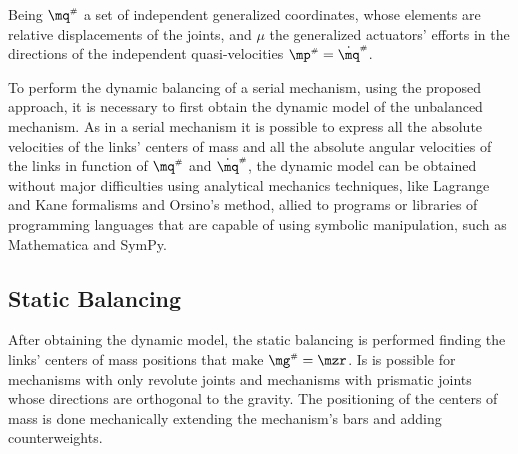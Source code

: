 \documentclass[a4paper,11pt,brazil,fleqn]{article}
\begin{document}
Being $\mq\ssh$ a set of independent generalized coordinates, whose elements are relative displacements of the joints, and $\mu$ the generalized actuators' efforts in the directions of the independent quasi-velocities $\mp\ssh = \dot{\mq}\ssh$.

To perform the dynamic balancing of a serial mechanism, using the proposed approach, it is necessary to first obtain the dynamic model of the unbalanced mechanism. As in a serial mechanism it is possible to express all the absolute velocities of the links' centers of mass and all the absolute angular velocities of the links in function of $\mq\ssh$ and $\dot{\mq}\ssh$, the dynamic model can be obtained without major difficulties using analytical mechanics techniques, like Lagrange and Kane formalisms and Orsino's method, allied to programs or libraries of programming languages that are capable of using symbolic manipulation, such as Mathematica and SymPy.


\subsection{Static Balancing}\label{S02-2}

After obtaining the dynamic model, the static balancing is performed finding the links' centers of mass positions that make $\mg\ssh = \mzr$. Is is possible for mechanisms with only revolute joints and mechanisms with prismatic joints whose directions are orthogonal to the gravity. The positioning of the centers of mass is done mechanically extending the mechanism's bars and adding counterweights.
\end{document}
